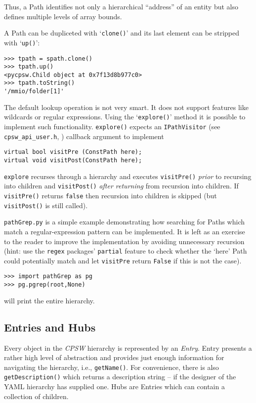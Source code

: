 \documentclass[10pt]{article}
\newcommand{\ita}[1]{\emph{#1}}
\newcommand{\cpsw}      {\ita {CPSW}}
\newcommand{\entry}     {{Entry}}
\newcommand{\entries}   {{Entries}}
\newcommand{\hubs}      {{Hubs}}
\newcommand{\Path}      {{Path}}
\newcommand{\Paths}     {{Paths}}
\newcommand{\cod}[1] {{\tt#1}}
\begin{document}
Thus, a \Path{} identifies not only a hierarchical ``address''
of an entity but also defines multiple levels of array bounds.

A \Path{} can be dupliceted with `\cod{clone()}' and its last element
can be stripped with `\cod{up()}':

\begin{verbatim}
>>> tpath = spath.clone()
>>> tpath.up()
<pycpsw.Child object at 0x7f13d8b977c0>
>>> tpath.toString()
'/mmio/folder[1]'
\end{verbatim}

The default lookup operation is not very smart. It does not support features
like wildcards or regular expressions. Using the `\cod{explore()}' method it is
possible to implement such functionality. \cod{explore()} expects an \cod{IPathVisitor}
(see \cod{cpsw\_api\_user.h}, \cite{userapi}) callback argument to implement 
\begin{verbatim}
virtual bool visitPre (ConstPath here);
virtual void visitPost(ConstPath here);
\end{verbatim}

\cod{explore} recurses through a hierarchy and executes \cod{visitPre()} {\em prior}
to recursing into children and \cod{visitPost()} {\em after returning} from recursion
into children. If \cod{visitPre()} returns \cod{false} then recursion into children
is skipped (but \cod{visitPost()} is still called).

\cod{pathGrep.py} is a simple example demonstrating how searching for \Paths{} which match
a regular-expression pattern can be implemented. It is left as an exercise to the reader
to improve the implementation by avoiding unnecessary recursion (hint: use the \cod{regex}
packages' \cod{partial} feature to check whether the `here' Path could potentially match
and let \cod{visitPre} return \cod{False} if this is not the case).

\begin{verbatim}
>>> import pathGrep as pg 
>>> pg.pgrep(root,None)
\end{verbatim}

will print the entire hierarchy.

\subsection{Entries and Hubs}
Every object in the \cpsw{} hierarchy is represented by an {\em \entry{}}. \entry{} presents
a rather high level of abstraction and provides just enough information for navigating
the hierarchy, i.e., \cod{getName()}. For convenience, there is also \cod{getDescription()}
which returns a description string -- if the designer of the YAML hierarchy has supplied
one. \hubs{} are \entries{} which can contain a collection of children.
\end{document}
